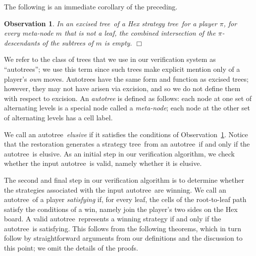 \documentclass{llncs}
\def\at{autotree}
\def\stt{strategy tree}
\def\gt{gametree}
\def\bpsn{board position}
\def\exct{excised tree}
\def\gs{game-state}
\def\endofproof{\hfill $\Box$}
\newtheorem{observation}[theorem]{Observation}
\begin{document}
The following is an immediate corollary of the preceding.

\begin{observation}\label{obs:elusive}
In an \exct\ of a Hex \stt\ for a player $\pi$,
for every meta-node $m$ that is not a leaf,
the combined intersection of the 
$\pi$-descendants of the subtrees of $m$ is empty.
\endofproof
\end{observation}


We refer to the class of trees that we use
in our verification system as ``\at s'';
we use this term since such trees
make explicit mention only of a player's {\it own} moves.
Autotrees have the same form and function
as \exct s; however, they may not have arisen via excision, 
and so we do not define them with respect to excision.
An {\it \at} is defined as follows:
each node at one set of alternating levels is
a special node called a {\it meta-node};
each node at the other set of alternating levels has a cell label.

We call an \at\ {\it elusive}
if it satisfies the conditions of Observation~\ref{obs:elusive}.
Notice that the restoration generates a \stt\ from
an \at\ if and only if the \at\ is elusive.
As an initial step in our verification algorithm,
we check whether the input \at\ is valid,
namely whether it is elusive.

The second and final step in our verification algorithm
is to determine whether the strategies
associated with the input \at\ are winning.
We call an \at\ of a player
{\it satisfying} if, for every leaf,
the cells of the root-to-leaf path 
satisfy the conditions of a win,
namely join the player's two sides on the Hex board.
A valid \at\ represents a winning strategy
if and only if the \at\ is satisfying.
This follows from the following theorems,
which in turn follow by straightforward arguments from
our definitions and the discussion to this point;
we omit the details of the proofs.
\end{document}
